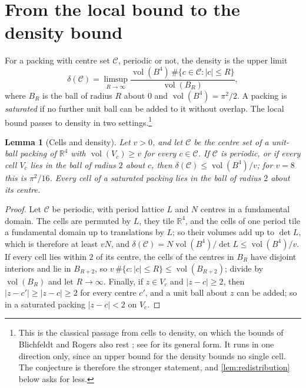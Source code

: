 \documentclass[11pt,reqno]{amsart}
\renewcommand{\_}{\origunderscore\allowbreak}
\numberwithin{equation}{section}
\theoremstyle{plain}
\newtheorem{lem}[thm]{Lemma}
\theoremstyle{definition}
\theoremstyle{remark}
\DeclareMathOperator{\vol}{vol}
\begin{document}
\section{From the local bound to the density bound}\label{sec:density-derivation}

For a packing with centre set $\mathcal{C}$, periodic or not, the density
is the upper limit
\[
  \delta(\mathcal{C})=\limsup_{R\to\infty}
  \frac{\vol(B^4)\,\#\{c\in\mathcal{C}:|c|\le R\}}{\vol(B_R)} ,
\]
where $B_R$ is the ball of radius $R$ about $0$ and $\vol(B^4)=\pi^2/2$.
A packing is \emph{saturated} if no further unit ball can be added to it
without overlap. The local bound passes to density in two
settings.\footnote{This is the classical passage from cells to density,
  on which the bounds of Blichfeldt and Rogers also rest
  \cite{Bli29,Rog64}; see \cite{Gru87} for its general form. It runs in
  one direction only, since an upper bound for the density bounds no single
  cell. The conjecture is therefore the stronger statement, and
  \cref{lem:redistribution} below asks for less.}

\begin{lem}[Cells and density]\label{lem:cells-density}
Let $v>0$, and let $\mathcal{C}$ be the centre set of a unit-ball packing of
$\mathbb{R}^4$ with $\vol(V_c)\ge v$ for every $c\in\mathcal{C}$. If
$\mathcal{C}$ is periodic, or if every cell $V_c$ lies in the ball of
radius $2$ about $c$, then $\delta(\mathcal{C})\le\vol(B^4)/v$; for $v=8$
this is $\pi^2/16$. Every cell of a saturated packing lies in the ball of
radius $2$ about its centre.
\end{lem}

\begin{proof}
Let $\mathcal{C}$ be periodic, with period lattice $L$ and $N$ centres in a
fundamental domain. The cells are permuted by $L$, they tile
$\mathbb{R}^4$, and the cells of one period tile a fundamental domain up to
translations by $L$; so their volumes add up to $\det L$, which is
therefore at least $vN$, and $\delta(\mathcal{C})=N\vol(B^4)/\det L\le
\vol(B^4)/v$. If every cell lies within $2$ of its centre, the
cells of the centres in $B_R$ have disjoint interiors and lie in
$B_{R+2}$, so $v\,\#\{c:|c|\le R\}\le\vol(B_{R+2})$; divide by
$\vol(B_R)$ and let $R\to\infty$. Finally, if $z\in V_c$ and
$|z-c|\ge2$, then $|z-c'|\ge|z-c|\ge2$ for every centre $c'$, and a unit
ball about $z$ can be added; so in a saturated packing $|z-c|<2$ on $V_c$.
\end{proof}
\end{document}
